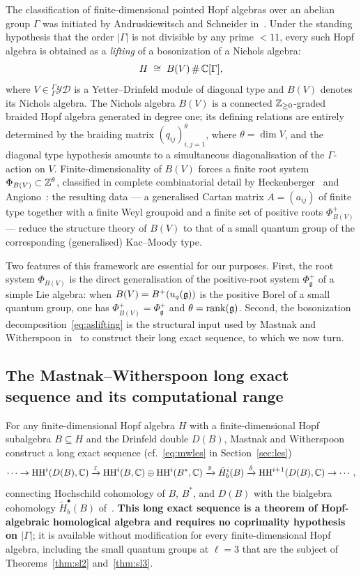 The classification of finite-dimensional pointed Hopf algebras over an abelian group $\Gamma$ was initiated by Andruskiewitsch and Schneider in~\cite{AS02}. Under the standing hypothesis that the order $|\Gamma|$ is not divisible by any prime $< 11$, every such Hopf algebra is obtained as a \emph{lifting} of a bosonization of a Nichols algebra:
\begin{equation}
\label{eq:aslifting}
H \;\cong\; B(V)\, \#\, \mathbb{C}[\Gamma],
\end{equation}
where $V \in {}^{\Gamma}_{\Gamma}\mathcal{YD}$ is a Yetter--Drinfeld module of diagonal type and $B(V)$ denotes its Nichols algebra. The Nichols algebra $B(V)$ is a connected $\mathbb{Z}_{\geq 0}$-graded braided Hopf algebra generated in degree one; its defining relations are entirely determined by the braiding matrix $(q_{ij})_{i,j=1}^{\theta}$, where $\theta = \dim V$, and the diagonal type hypothesis amounts to a simultaneous diagonalisation of the $\Gamma$-action on $V$. Finite-dimensionality of $B(V)$ forces a finite root system $\Phi_{B(V)} \subset \mathbb{Z}^\theta$, classified in complete combinatorial detail by Heckenberger~\cite{Hec09} and Angiono~\cite{Ang09}: the resulting data --- a generalised Cartan matrix $A = (a_{ij})$ of finite type together with a finite Weyl groupoid and a finite set of positive roots $\Phi^+_{B(V)}$ --- reduce the structure theory of $B(V)$ to that of a small quantum group of the corresponding (generalised) Kac--Moody type.

Two features of this framework are essential for our purposes. First, the root system $\Phi_{B(V)}$ is the direct generalisation of the positive-root system $\Phi^+_\mathfrak{g}$ of a simple Lie algebra: when $B(V) = B^{+}(u_q(\mathfrak{g}))$ is the positive Borel of a small quantum group, one has $\Phi^+_{B(V)} = \Phi^+_\mathfrak{g}$ and $\theta = \operatorname{rank}(\mathfrak{g})$. Second, the bosonization decomposition~\eqref{eq:aslifting} is the structural input used by Mastnak and Witherspoon in~\cite{MW08} to construct their long exact sequence, to which we now turn.

\subsection{The Mastnak--Witherspoon long exact sequence and its computational range}
\label{sec:mw_les}

For any finite-dimensional Hopf algebra $H$ with a finite-dimensional Hopf subalgebra $B \subseteq H$ and the Drinfeld double $D(B)$, Mastnak and Witherspoon~\cite[Eq.~(3.3.1)]{MW08} construct a long exact sequence (cf.\ \eqref{eq:mwles} in Section~\ref{sec:les})
\[
\cdots \to \operatorname{HH}^i(D(B), \mathbb{C}) \xrightarrow{\bar\iota} \operatorname{HH}^i(B, \mathbb{C}) \oplus \operatorname{HH}^i(B^*, \mathbb{C}) \xrightarrow{\bar\pi} \tilde{H}^i_b(B) \xrightarrow{\delta} \operatorname{HH}^{i+1}(D(B), \mathbb{C}) \to \cdots,
\]
connecting Hochschild cohomology of $B$, $B^*$, and $D(B)$ with the bialgebra cohomology $\tilde{H}^\bullet_b(B)$ of~\cite{MW08}. \textbf{This long exact sequence is a theorem of Hopf-algebraic homological algebra and requires no coprimality hypothesis on $|\Gamma|$}; it is available without modification for every finite-dimensional Hopf algebra, including the small quantum groups at $\ell = 3$ that are the subject of Theorems~\ref{thm:sl2} and~\ref{thm:sl3}.

